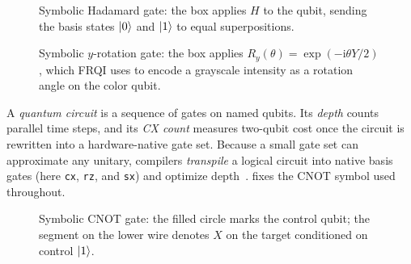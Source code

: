 \begin{figure}[htbp]
\centering
{}
\caption{Symbolic Hadamard gate: the box applies $H$ to the qubit, sending the basis states $\ket{0}$ and $\ket{1}$ to equal superpositions.}
\label{fig:tikz-hadamard}
\end{figure}

\begin{figure}[htbp]
\centering
{}
\caption{Symbolic $y$-rotation gate: the box applies $R_y(\theta)=\exp(-\mathrm{i}\theta Y/2)$, which FRQI uses to encode a grayscale intensity as a rotation angle on the color qubit.}
\label{fig:tikz-ry}
\end{figure}

A \emph{quantum circuit} is a sequence of gates on named qubits. Its \emph{depth} counts parallel time steps, and its \emph{CX count} measures two-qubit cost once the circuit is rewritten into a hardware-native gate set. Because a small gate set can approximate any unitary, compilers \emph{transpile} a logical circuit into native basis gates (here \texttt{cx}, \texttt{rz}, and \texttt{sx}) and optimize depth~\cite{NielsenChuang2010}.  fixes the CNOT symbol used throughout.

\begin{figure}[htbp]
\centering
{}
\caption{Symbolic CNOT gate: the filled circle marks the control qubit; the segment on the lower wire denotes $X$ on the target conditioned on control $\ket{1}$.}
\label{fig:tikz-cnot}
\end{figure}

